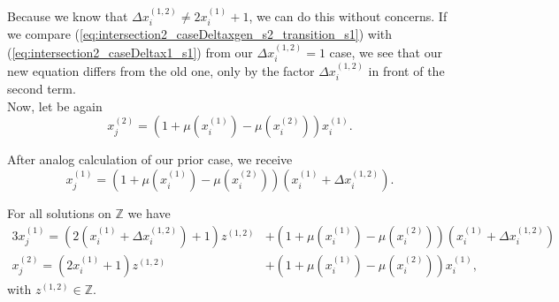 Because we know that $\Delta x_{i}^{\left(1,2\right)} \neq 2x_{i}^{\left(1\right)} + 1$, we can do this without concerns. If we compare (\ref{eq:intersection2_caseDeltaxgen_s2_transition_s1}) with (\ref{eq:intersection2_caseDeltax1_s1}) from our $\Delta x_{i}^{\left(1,2\right)} = 1$ case, we see that our new equation differs from the old one, only by the factor $\Delta x_{i}^{\left(1,2\right)}$ in front of the second term.\\

Now, let be again
\begin{equation}
	x_{j}^{\left(2\right)} = \left(1 + \mu\left(x_{i}^{\left(1\right)}\right) - \mu\left(x_{i}^{\left(2\right)}\right)\right)x_{i}^{\left(1\right)}.
\label{eq:solxj2deltagen}
\end{equation}

After analog calculation of our prior case, we receive
\begin{equation}
	x_{j}^{\left(1\right)} = \left(1 + \mu\left(x_{i}^{\left(1\right)}\right) - \mu\left(x_{i}^{\left(2\right)}\right)\right)\left(x_{i}^{\left(1\right)} + \Delta x_{i}^{\left(1,2\right)}\right).
\label{eq:solxj1deltagen}
\end{equation}

For all solutions on $\mathbb{Z}$ we have
\begin{alignat}{3}
	x_{j}^{\left(1\right)} = \left(2\left(x_{i}^{\left(1\right)} + \Delta x_{i}^{\left(1,2\right)}\right) + 1\right)z^{\left(1,2\right)} &+ \left(1 + \mu\left(x_{i}^{\left(1\right)}\right) - \mu\left(x_{i}^{\left(2\right)}\right)\right)\left(x_{i}^{\left(1\right)} + \Delta x_{i}^{\left(1,2\right)}\right) \label{eq:solxj1deltagen_all} \\
	x_{j}^{\left(2\right)} = \left(2x_{i}^{\left(1\right)} + 1\right)z^{\left(1,2\right)} &+ \left(1 + \mu\left(x_{i}^{\left(1\right)}\right) - \mu\left(x_{i}^{\left(2\right)}\right)\right)x_{i}^{\left(1\right)} \label{eq:solxj2deltagen_all},
\end{alignat}
with $z^{\left(1,2\right)} \in \mathbb{Z}$.\\

